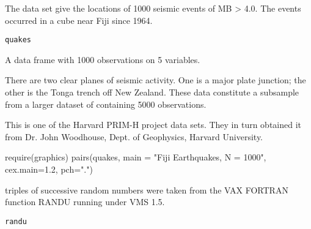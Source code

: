 %
\begin{Description}\relax
The data set give the locations of 1000 seismic events of MB > 4.0.
The events occurred in a cube near Fiji since 1964.
\end{Description}
%
\begin{Usage}
\begin{verbatim}
quakes
\end{verbatim}
\end{Usage}
%
\begin{Format}
A data frame with 1000 observations on 5 variables.

\end{Format}
%
\begin{Details}\relax
There are two clear planes of seismic activity.  One is a major plate
junction; the other is the Tonga trench off New Zealand.  These data
constitute a subsample from a larger dataset of containing 5000
observations.
\end{Details}
%
\begin{Source}\relax
This is one of the Harvard PRIM-H project data sets.  They in turn
obtained it from Dr. John Woodhouse, Dept. of Geophysics, Harvard
University.
\end{Source}
%
\begin{Examples}
\begin{ExampleCode}
require(graphics)
pairs(quakes, main = "Fiji Earthquakes, N = 1000", cex.main=1.2, pch=".")
\end{ExampleCode}
\end{Examples}
%
\begin{Description} triples of successive random numbers were taken from the VAX
FORTRAN function RANDU running under VMS 1.5.
\end{Description}
%
\begin{Usage}
\begin{verbatim}
randu
\end{verbatim}
\end{Usage}
